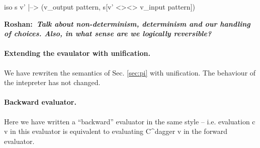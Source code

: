 \documentclass[preprint]{sigplanconf}
\newcommand{\xcomment}[2]{\textbf{#1:~\textsl{#2}}}
\newcommand{\roshan}[1]{\xcomment{Roshan}{#1}}
\begin{document}
{{ iso s v' |--> (v_{output pattern}, s[v' <><> v_{input pattern}]) }}


\roshan{Talk about non-determinism, determinism and our handling of
  choices. Also, in what sense are we logically reversible?}

\paragraph{Extending the evaulator with unification.} 
We have rewriten the semantics of Sec. \ref{sec:pi} with
unification. The behaviour of the intepreter has not changed.


\paragraph{Backward evaluator.}
Here we have written a ``backward'' evaluator in the same style --
i.e. evaluation {{c v}} in this evaluator is equivalent to evaluating
{{C^{dagger} v}} in the forward evaluator.

\end{document}
